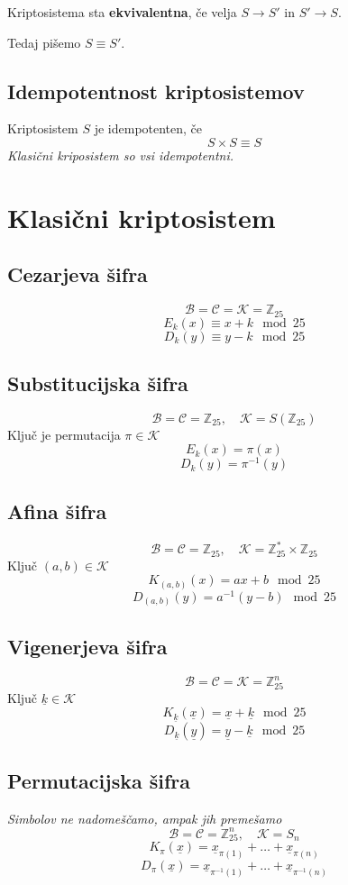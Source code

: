 \begin{multicols}{4}
Kriptosistema sta \textbf{ekvivalentna}, če velja $S \to S'$ in $S' \to S$.

Tedaj pišemo $S \equiv S'$.

\subsection*{Idempotentnost kriptosistemov}
Kriptosistem $S$ je idempotenten, če
\[ S \times S \equiv S\]
\textit{Klasični kriposistem so vsi idempotentni.}

\section*{Klasični kriptosistem}
\subsection*{Cezarjeva šifra}
\[ \mathcal{B} = \mathcal{C} = \mathcal{K} = \mathbb{Z}_{25}\]
\[ E_k(x) \equiv x + k \mod 25\]
\[ D_k(y) \equiv y - k \mod 25\]

\subsection*{Substitucijska šifra}
\[ \mathcal{B} = \mathcal{C} = \mathbb{Z}_{25}, \quad \mathcal{K} = S(\mathbb{Z}_{25})\]
Ključ je permutacija $\pi \in \mathcal{K}$
\[ E_k(x) = \pi(x) \]
\[ D_k(y) = \pi^{-1}(y) \]

\subsection*{Afina šifra}
\[ \mathcal{B} = \mathcal{C} = \mathbb{Z}_{25}, \quad \mathcal{K} = \mathbb{Z}_{25}^{*} \times \mathbb{Z}_{25} \]
Ključ $(a, b) \in \mathcal{K}$
\[ K_{(a,b)}(x) = ax + b \mod 25\]
\[ D_{(a,b)}(y) = a^{-1}(y - b) \mod 25\]

\subsection*{Vigenerjeva šifra}
\[ \mathcal{B} = \mathcal{C} = \mathcal{K} = \mathbb{Z}_{25}^n\]
Ključ $\underline{k} \in \mathcal{K}$
\[ K_{\underline{k}}(\underline{x}) = \underline{x} + \underline{k} \mod 25\]
\[ D_{\underline{k}}(\underline{y}) = \underline{y} - \underline{k} \mod 25\]

\subsection*{Permutacijska šifra}
\textit{Simbolov ne nadomeščamo, ampak jih premešamo}
\[ \mathcal{B} = \mathcal{C} = \mathbb{Z}_{25}^n, \quad \mathcal{K} = S_n\]
\[ K_{\pi}(\underline{x}) = \underline{x}_{\pi(1)} + \dots + \underline{x}_{\pi(n)}  \]
\[ D_{\pi}(\underline{x}) = \underline{x}_{\pi^{-1}(1)} + \dots + \underline{x}_{\pi^{-1}(n)}  \]


\end{multicols}
